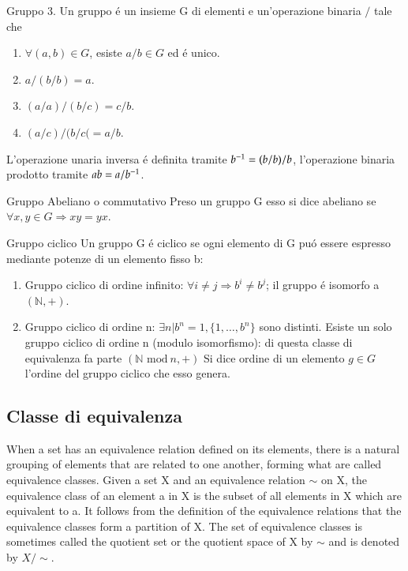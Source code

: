 \documentclass[oneside,12pt]{memoir}
\begin{document}
\begin{definition}{Gruppo 3.}
Un gruppo \'e un insieme G di elementi e un'operazione binaria $/$ tale che
\begin{enumerate}
\item $\forall (a,b)\in G$, esiste $a/b\in G$ ed \'e unico.
\item $a/(b/b)=a$.
\item $(a/a)/(b/c)=c/b$.
\item $(a/c)/(b/c(=a/b$.
\end{enumerate}
L'operazione unaria inversa \'e definita tramite ${{b}^{-1}}=(b/b)/b$, l'operazione binaria prodotto tramite $ab=a/{{b}^{-1}}$.
\end{definition}

\begin{definition}{Gruppo Abeliano o commutativo}
Preso un gruppo G esso si dice abeliano se  $\forall x,y \in G \Rightarrow xy=yx$.
\end{definition}

\begin{definition}{Gruppo ciclico}
Un gruppo G \'e ciclico se ogni elemento di G pu\'o essere espresso mediante potenze di un elemento fisso b:
\begin{enumerate}
\item Gruppo ciclico di ordine infinito: $\forall i\neq j \Rightarrow b^i\neq b^j $; il gruppo \'e isomorfo a $(\mathbb{N},+)$.
\item Gruppo ciclico di ordine n: $ \exists n  \lvert b^{n}=1 , \{1,\ldots ,b^n\}$ sono distinti.
Esiste un solo gruppo ciclico di ordine n (modulo isomorfismo): di questa classe di equivalenza fa parte $(\mathbb{N}  \textrm{ mod}\  n ,+)$
Si dice ordine di un elemento $g\in G$  l'ordine del gruppo ciclico che esso genera.
\end{enumerate}
\end{definition}

\subsection{Classe di equivalenza}


When a set has an equivalence relation defined on its elements, there is a natural grouping of elements that are related to one another, forming what are called equivalence classes. Given a set X and an equivalence relation $\sim$ on X, the equivalence class of an element a in X is the subset of all elements in X which are equivalent to a. It follows from the definition of the equivalence relations that the equivalence classes form a partition of X. The set of equivalence classes is sometimes called the quotient set or the quotient space of X by $\sim$ and is denoted by $X / \sim$.
\end{document}
